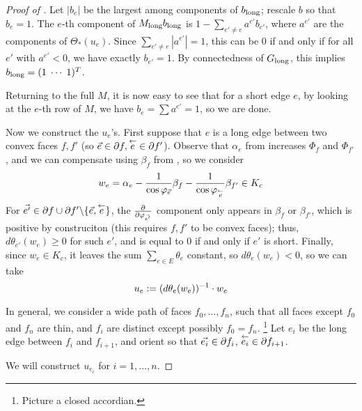 \begin{proof}[Proof of ]
Let $|b_e|$ be the largest among components of $b_{\text{long}}$;
rescale $b$ so that $b_e = 1$.
The $e$-th component of $M_{\text{long}} b_{\text{long}}$
is $1 - \sum_{e' \neq e} a^{e'} b_{e'}$,
where $a^{e'}$ are the components of $\Theta_*(u_e)$.
Since $\sum_{e' \neq e} |a^{e'}| = 1$, this can be 0 if and only if
for all $e'$ with $a^{e'} < 0$, we have exactly $b_{e'} = 1$.
By connectedness of $G_{\text{long}}$, this implies
$b_{\text{long}} = (1 \; \cdots \; 1)^T$.


Returning to the full $M$, it is now easy to see that
for a short edge $e$,
by looking at the $e$-th row of $M$,
we have $b_e = \sum a^{e'} = 1$,
so we are done.



Now we construct the $u_e$'s.
First suppose that $e$ is a long edge between two convex faces $f, f'$
(so $\vec{e} \in \partial f, \overset{\leftarrow}{e} \in \partial f'$).
Observe that $\alpha_e$ from 
increases $\Phi_f$ and $\Phi_{f'}$,
and we can compensate using $\beta_f$ from ,
so we consider
\[
w_e = \alpha_e - \frac{1}{\cos \varphi_{\vec{e}}} \beta_f
	- \frac{1}{\cos \varphi_{\overset{\leftarrow}{e}}} \beta_{f'} \in K_c
\]
For $\vec{e'} \in \partial f \cup \partial f' \backslash \{\vec{e},\overset{\leftarrow}{e}\}$,
the ${\frac{\partial}{\partial \varphi_{\vec{e'}}}}$ component only appears in $\beta_f$
or $\beta_{f'}$, which is positive by construciton
(this requires $f,f'$ to be convex faces);
thus, $d\theta_{e'}(w_e) \geq 0$ for such $e'$, and
is equal to 0 if and only if $e'$ is short.
Finally, since $w_e \in K_c$, it leaves the sum $\sum_{e\in E} \theta_e$
constant, so $d\theta_e(w_e) < 0$, so we can take
\begin{equation}
\label{e:u_e}
u_e := (d\theta_e(w_e))^{-1} \cdot w_e
\end{equation}

In general, we consider a wide path of faces $f_0, \ldots, f_n$,
such that all faces except $f_0$ and $f_n$ are thin,
and $f_i$ are distinct except possibly $f_0 = f_n$.
\footnote{Picture a closed accordian.}
Let $e_i$ be the long edge between $f_i$ and $f_{i+1}$,
and orient so that $\vec{e_i} \in \partial f_i$, $\overset{\leftarrow}{e_i} \in \partial f_{i+1}$.


We will construct $u_{e_i}$ for $i = 1,\ldots,n$.



\end{proof}
